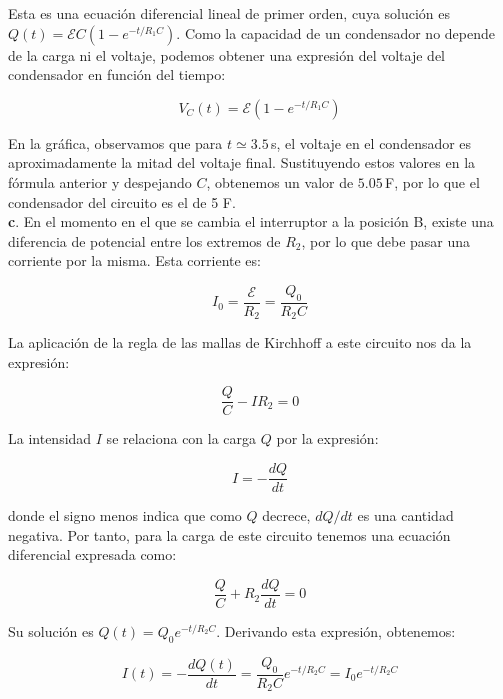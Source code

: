 Esta es una ecuación diferencial lineal de primer orden, cuya solución es $Q(t) = \mathcal{E} C(1 - e^{- t / R_1 C})$.
Como la capacidad de un condensador no depende de la carga ni el voltaje, podemos obtener una expresión del voltaje del condensador
en función del tiempo:


\begin{equation*}
    V_C(t) = \mathcal{E}(1 - e^{- t / R_1 C})
\end{equation*}

En la gráfica, observamos que para $t \simeq 3.5$\,s, el voltaje en el condensador es aproximadamente la mitad del voltaje final.
Sustituyendo estos valores
en la fórmula anterior y despejando $C$, obtenemos un valor de $5.05$\,F, por lo que el condensador del circuito es el de 5 F.\\

\vspace{20px}
\textbf{c}. En el momento en el que se cambia el interruptor a la posición B, existe una diferencia de potencial entre los extremos de $R_2$,
por lo que debe pasar una corriente por la misma. Esta corriente es:

\begin{equation*}
    I_0 = \frac{\mathcal{E}}{R_2} = \frac{Q_0}{R_2 C}
\end{equation*}

La aplicación de la regla de las mallas de Kirchhoff a este circuito nos da la expresión:

\begin{equation*}
    \frac{Q}{C} - I R_2 = 0
\end{equation*}

La intensidad $I$ se relaciona con la carga $Q$ por la expresión:

\begin{equation*}
    I = - \frac{dQ}{dt}
\end{equation*}

donde el signo menos indica que como $Q$ decrece, $dQ / dt$ es una cantidad negativa. Por tanto, para la carga de este circuito tenemos
una ecuación diferencial expresada como:


\begin{equation*}
    \frac{Q}{C} + R_2 \frac{dQ}{dt} = 0
\end{equation*}

Su solución es $Q(t) = Q_0 e^{-t/R_2 C}$. Derivando esta expresión, obtenemos:

\begin{equation*}
    I(t) = - \frac{dQ(t)}{dt} = \frac{Q_0}{R_2 C} e^{-t/R_2 C} = I_0 e^{-t/R_2 C}
\end{equation*}

